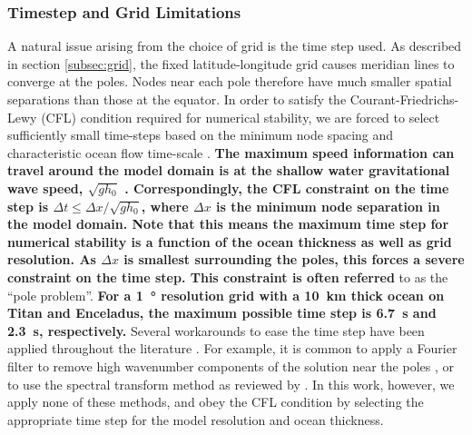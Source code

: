 \subsubsection{\textbf{Timestep and Grid Limitations} \label{subsubsec:grid_limits}}

A natural issue arising from the choice of grid is the time step used. As described in section \ref{subsec:grid}, the fixed latitude-longitude grid causes meridian lines to converge at the poles. Nodes near each pole therefore have much smaller spatial separations than those at the equator. In order to satisfy the Courant-Friedrichs-Lewy (CFL) condition required for numerical stability, we are forced to select sufficiently small time-steps based on the minimum node spacing and characteristic ocean flow time-scale \citep{arakawa1977computational,sears1995tidal}. \textbf{The maximum speed information can travel around the model domain is at the shallow water gravitational wave speed, $\sqrt{gh_0}$ \citep{lamb1932hydrodynamics}. Correspondingly, the CFL constraint on the time step is $\Delta t \leqslant \Delta x / \sqrt{gh_0}$, where $\Delta x$ is the minimum node separation in the model domain. Note that this means the maximum time step for numerical stability is a function of the ocean thickness as well as grid resolution. As $\Delta x$ is smallest surrounding the poles, this forces a severe constraint on the time step. This constraint is often referred} to as the ``pole problem''. \textbf{For a \SI{1}{\degree} resolution grid with a \SI{10}{\kilo\metre} thick ocean on Titan and Enceladus, the maximum possible time step is \SI{6.7}{\second} and \SI{2.3}{\second}, respectively.} Several workarounds to ease the time step have been applied throughout the literature \citep{comblen2009finite}. For example, it is common to apply a Fourier filter to remove high wavenumber components of the solution near the poles \citep{murray2002fourier}, or to use the spectral transform method as reviewed by \citet{swarztrauber1996spectral}. In this work, however, we apply none of these methods, and obey the CFL condition by selecting the appropriate time step for the model resolution and ocean thickness.

